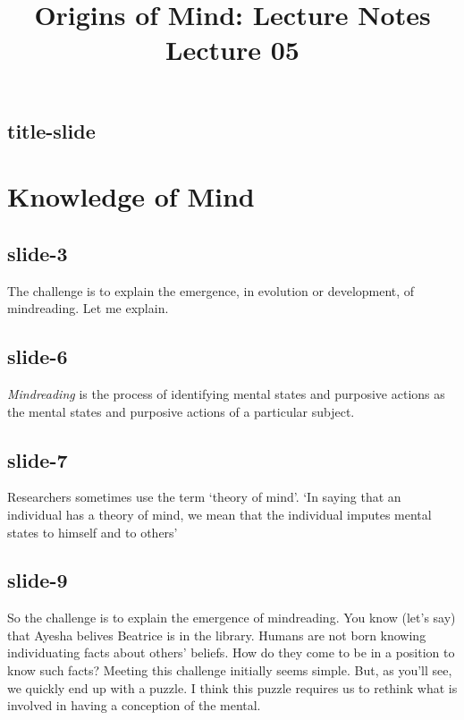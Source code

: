 \documentclass[12pt,\papersize]{extarticle}
\begin{document}
\setlength\footnotesep{1em}








\title {Origins of Mind: Lecture Notes \\ Lecture 05}
 
\maketitle
 
 
\subsection{title-slide}
 
\section{Knowledge of Mind}
 
 
\subsection{slide-3}
The challenge is to explain the emergence, in evolution or development, of mindreading.
Let me explain.
 
 
\subsection{slide-6}
\textit{Mindreading} is the process of identifying mental states and purposive actions as the mental states and purposive actions of a particular subject.
 
 
\subsection{slide-7}
Researchers sometimes use the term ‘theory of mind’.
‘In saying that an individual has a theory of mind, we mean that the individual imputes mental states to himself and to others’
\citep[p.\ 515]{premack_does_1978}
 
 
\subsection{slide-9}
So the challenge is to explain the emergence of mindreading.
You know (let's say) that Ayesha belives Beatrice is in the library.
Humans are not born knowing individuating facts about others' beliefs.
How do they come to be in a position to know such facts?
Meeting this challenge initially seems simple.
But, as you'll see, we quickly end up with a puzzle.
I think this puzzle requires us to rethink what is involved in having a conception of the mental.
 
\end{document}
